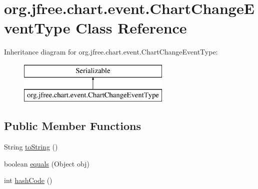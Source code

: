 \hypertarget{classorg_1_1jfree_1_1chart_1_1event_1_1_chart_change_event_type}{}\section{org.\+jfree.\+chart.\+event.\+Chart\+Change\+Event\+Type Class Reference}
\label{classorg_1_1jfree_1_1chart_1_1event_1_1_chart_change_event_type}
Inheritance diagram for org.\+jfree.\+chart.\+event.\+Chart\+Change\+Event\+Type\+:\begin{figure}[H]
\begin{center}
\leavevmode
\includegraphics[height=2.000000cm]{classorg_1_1jfree_1_1chart_1_1event_1_1_chart_change_event_type}
\end{center}
\end{figure}
\subsection*{Public Member Functions}
\begin{DoxyCompactItemize}
\item 
String \mbox{\hyperlink{classorg_1_1jfree_1_1chart_1_1event_1_1_chart_change_event_type_a7f2ca8a4fc638e98f597a22e5051d78a}{to\+String}} ()
\item 
boolean \mbox{\hyperlink{classorg_1_1jfree_1_1chart_1_1event_1_1_chart_change_event_type_a1f65b7ce37a00cc147a07ae934ef379d}{equals}} (Object obj)
\item 
int \mbox{\hyperlink{classorg_1_1jfree_1_1chart_1_1event_1_1_chart_change_event_type_a85b08285b4b26ad9b573b69225e80e74}{hash\+Code}} ()
\end{DoxyCompactItemize}
